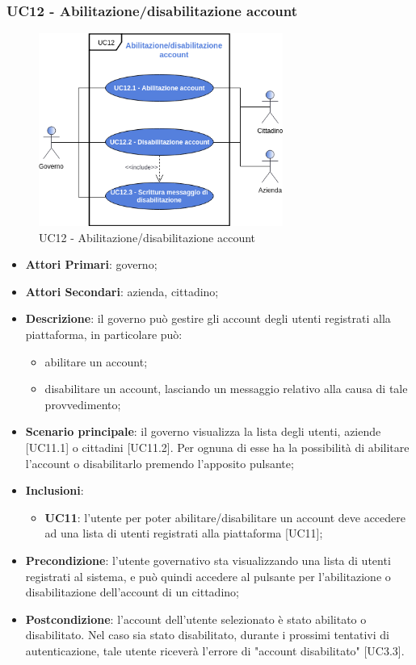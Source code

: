 \subsubsection{UC12 - Abilitazione/disabilitazione account}
\begin{figure}[h]
	\includegraphics[width=8cm]{res/images/UC12-Generale.png}
	\centering
	\caption{UC12 - Abilitazione/disabilitazione account}
\end{figure}
\begin{itemize}
	\item \textbf{Attori Primari}:
	governo;
	\item \textbf{Attori Secondari}:
	azienda, cittadino;
	\item \textbf{Descrizione}: il governo può gestire gli account degli utenti registrati alla piattaforma, in particolare può:
	\begin{itemize}
		\item abilitare un account;
		\item disabilitare un account, lasciando un messaggio relativo alla causa di tale provvedimento;
	\end{itemize}
	\item \textbf{Scenario principale}: il governo visualizza la lista degli utenti, aziende [UC11.1] o cittadini [UC11.2]. Per ognuna di esse ha la possibilità di abilitare l'account o disabilitarlo premendo l'apposito pulsante;
	\item \textbf{Inclusioni}: 
	\begin{itemize}
		\item \textbf{UC11}: l'utente per poter abilitare/disabilitare un account deve accedere ad una lista di utenti registrati alla piattaforma [UC11];
	\end{itemize}
	\item \textbf{Precondizione}: l'utente governativo sta visualizzando una lista di utenti registrati al sistema, e può quindi accedere al pulsante per l'abilitazione o disabilitazione dell'account di un cittadino;
	\item \textbf{Postcondizione}: l'account dell'utente selezionato è stato abilitato o disabilitato. Nel caso sia stato disabilitato, durante i prossimi tentativi di autenticazione, tale utente riceverà l'errore di "account disabilitato" [UC3.3].
\end{itemize} 

